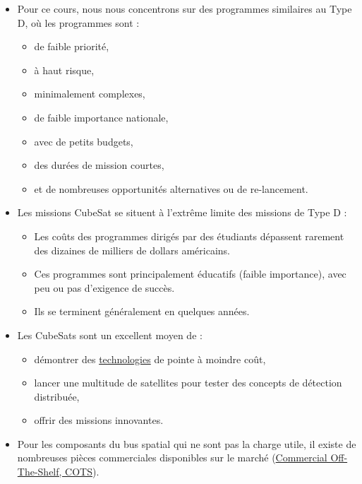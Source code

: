 \begin{itemize}
    \item Pour ce cours, nous nous concentrons sur des programmes similaires au Type D, où les programmes sont :
    \begin{itemize}
        \item de faible priorité,  
        \item à haut risque,  
        \item minimalement complexes,  
        \item de faible importance nationale,  
        \item avec de petits budgets,  
        \item des durées de mission courtes,  
        \item et de nombreuses opportunités alternatives ou de re-lancement.  
    \end{itemize}
    
    \item Les missions CubeSat se situent à l'extrême limite des missions de Type D :
    \begin{itemize}
        \item Les coûts des programmes dirigés par des étudiants dépassent rarement des dizaines de milliers de dollars américains.  
        \item Ces programmes sont principalement éducatifs (faible importance), avec peu ou pas d'exigence de succès.  
        \item Ils se terminent généralement en quelques années.  
    \end{itemize}
    
    \item Les CubeSats sont un excellent moyen de :
    \begin{itemize}
        \item démontrer des \href{https://www.nasa.gov/smallsat-institute/sst-soa}{technologies} de pointe à moindre coût,  
        \item lancer une multitude de satellites pour tester des concepts de détection distribuée,  
        \item offrir des missions innovantes.  
    \end{itemize}
    
    \item Pour les composants du bus spatial qui ne sont pas la charge utile, il existe de nombreuses pièces commerciales disponibles sur le marché (\href{http://www.cubesat.org/}{Commercial Off-The-Shelf, COTS}).  
    

\end{itemize}
